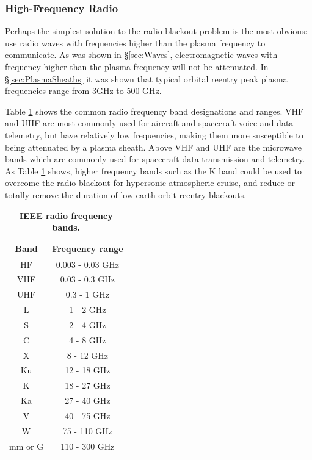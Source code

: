 \documentclass[twocolumn]{article}
\begin{document}
	\subsubsection*{High-Frequency Radio}
	Perhaps the simplest solution to the radio blackout problem is the most obvious: use radio waves with frequencies higher than the plasma frequency to communicate.
	As was shown in \S\ref{sec:Waves}, electromagnetic waves with frequency higher than the plasma frequency will not be attenuated.
	In \S\ref{sec:PlasmaSheaths} it was shown that typical orbital reentry peak plasma frequencies range from 3GHz to 500 GHz.
	
	Table \ref{tab:RadioBands} shows the common radio frequency band designations and ranges.
	VHF and UHF are most commonly used for aircraft and spacecraft voice and data telemetry, but have relatively low frequencies, making them more susceptible to being attenuated by a plasma sheath.
	Above VHF and UHF are the microwave bands which are commonly used for spacecraft data transmission and telemetry.
	As Table \ref{tab:RadioBands} shows, higher frequency bands such as the K band could be used to overcome the radio blackout for hypersonic atmospheric cruise, and reduce or totally remove the duration of low earth orbit reentry blackouts.
	
	\begin{table}[H]	
		\centering
		\begin{tabular}{c|c}
			Band    & Frequency range   \\ \hline
			HF      & 0.003 - 0.03 GHz \\
			VHF     & 0.03 - 0.3 GHz   \\
			UHF     & 0.3 - 1 GHz      \\
			L       & 1 - 2 GHz        \\
			S       & 2 - 4 GHz        \\
			C       & 4 - 8 GHz        \\
			X       & 8 - 12 GHz       \\
			Ku      & 12 - 18 GHz      \\
			K       & 18 - 27 GHz      \\
			Ka      & 27 - 40 GHz      \\
			V       & 40 - 75 GHz      \\
			W       & 75 - 110 GHz     \\
			mm or G & 110 - 300 GHz​  
		\end{tabular}
		\caption{\textbf{IEEE radio frequency bands.}}
		\label{tab:RadioBands}
	\end{table}
	
\end{document}
